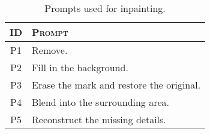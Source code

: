 \begin{table}[t]
\caption{Prompts used for inpainting.}
\label{tab:prompts_small}
\vskip 0.1in
\begin{center}
\begin{small}
\begin{tabular}{c|l}
    \toprule
        \textsc{ID} & \textsc{ Prompt}  \\
        \midrule
        \textsc{P1} & Remove. \\
        \textsc{P2} & Fill in the background. \\
        \textsc{P3} & Erase the mark and restore the original. \\
        \textsc{P4} & Blend into the surrounding area. \\
        \textsc{P5} & Reconstruct the missing details. \\
    \bottomrule
\end{tabular}
\end{small}
\end{center}
\vskip -0.1in
\end{table} 